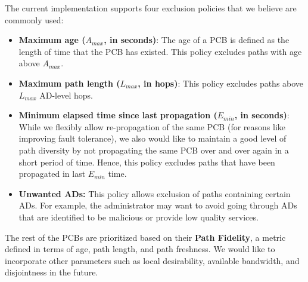 The current implementation supports four exclusion policies that we
believe are commonly used:
\begin{itemize}
\item {\bf Maximum age ($A_{max}$, in seconds)}: The age of a PCB is
  defined as the length of time that the PCB has existed. This policy
  excludes paths with age above $A_{max}$.
\item {\bf Maximum path length ($L_{max}$, in hops)}: This policy
  excludes paths above $L_{max}$ AD-level hops.
\item {\bf Minimum elapsed time since last propagation ($E_{min}$, in
  seconds)}: While we flexibly allow re-propagation of the same PCB
  (for reasons like improving fault tolerance), we also would like to
  maintain a good level of path diversity by not propagating the same
  PCB over and over again in a short period of time. Hence, this
  policy excludes paths that have been propagated in last $E_{min}$
  time.
\item {\bf Unwanted ADs:} This policy allows exclusion of paths
  containing certain ADs. For example, the administrator may want to
  avoid going through ADs that are identified to be malicious or
  provide low quality services.
\end{itemize}

The rest of the PCBs are prioritized based on their {\bf Path
  Fidelity}, a metric defined in terms of age, path length, and path
freshness. We would like to incorporate other parameters such as
local desirability, available bandwidth, and disjointness in the
future. 



